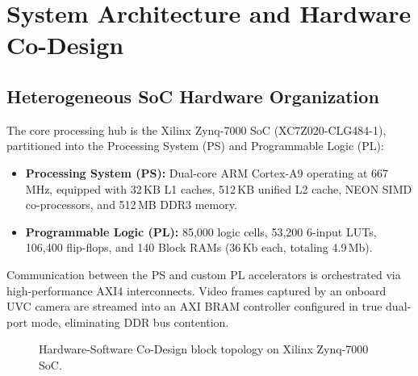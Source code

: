 \documentclass[conference]{IEEEtran}
\begin{document}
\section{System Architecture and Hardware Co-Design}

\subsection{Heterogeneous SoC Hardware Organization}
The core processing hub is the Xilinx Zynq-7000 SoC (XC7Z020-CLG484-1), partitioned into the Processing System (PS) and Programmable Logic (PL):
\begin{itemize}
    \item \textbf{Processing System (PS):} Dual-core ARM Cortex-A9 operating at 667\,MHz, equipped with 32\,KB L1 caches, 512\,KB unified L2 cache, NEON SIMD co-processors, and 512\,MB DDR3 memory.
    \item \textbf{Programmable Logic (PL):} 85,000 logic cells, 53,200 6-input LUTs, 106,400 flip-flops, and 140 Block RAMs (36\,Kb each, totaling 4.9\,Mb).
\end{itemize}

Communication between the PS and custom PL accelerators is orchestrated via high-performance AXI4 interconnects. Video frames captured by an onboard UVC camera are streamed into an AXI BRAM controller configured in true dual-port mode, eliminating DDR bus contention.

\begin{figure}[htbp]
\centering
{}
\caption{Hardware-Software Co-Design block topology on Xilinx Zynq-7000 SoC.}
\label{fig:arch}
\end{figure}
\end{document}
